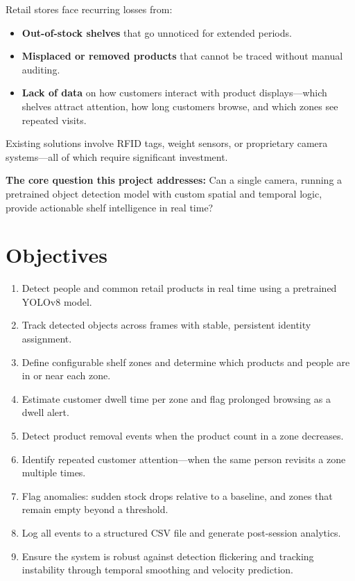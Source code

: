 \documentclass[12pt,a4paper]{article}
\begin{document}
Retail stores face recurring losses from:
\begin{itemize}[nosep]
    \item \textbf{Out-of-stock shelves} that go unnoticed for extended periods.
    \item \textbf{Misplaced or removed products} that cannot be traced without manual auditing.
    \item \textbf{Lack of data} on how customers interact with product displays—which shelves attract attention, how long customers browse, and which zones see repeated visits.
\end{itemize}

Existing solutions involve RFID tags, weight sensors, or proprietary camera systems—all of which require significant investment.

\textbf{The core question this project addresses:} Can a single camera, running a pretrained object detection model with custom spatial and temporal logic, provide actionable shelf intelligence in real time?

\section{Objectives}

\begin{enumerate}[nosep]
    \item Detect people and common retail products in real time using a pretrained YOLOv8 model.
    \item Track detected objects across frames with stable, persistent identity assignment.
    \item Define configurable shelf zones and determine which products and people are in or near each zone.
    \item Estimate customer dwell time per zone and flag prolonged browsing as a dwell alert.
    \item Detect product removal events when the product count in a zone decreases.
    \item Identify repeated customer attention—when the same person revisits a zone multiple times.
    \item Flag anomalies: sudden stock drops relative to a baseline, and zones that remain empty beyond a threshold.
    \item Log all events to a structured CSV file and generate post-session analytics.
    \item Ensure the system is robust against detection flickering and tracking instability through temporal smoothing and velocity prediction.
\end{enumerate}
\end{document}
